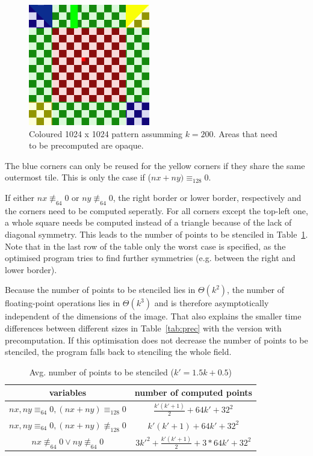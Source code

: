 \documentclass[letterpaper,twocolumn,10pt]{article}
\begin{document}
\begin{figure}[t]
	\begin{center}
	\includegraphics[width=150pt]{res/stencil_colored_with_prec}
	\caption{Coloured 1024 x 1024 pattern assumming $k = 200$. Areas that need to be precomputed are opaque.}
	\label{fig:board}
	\end{center}
	\vspace{-0.3in}
\end{figure}

The blue corners can only be reused for the yellow corners
if they share the same outermost tile. This is only the
case if ($nx + ny) \equiv_{128} 0$.

If either $nx \not\equiv_{64} 0$ or $ny \not\equiv_{64}0$, the right border or lower border,
respectively and the corners need to be computed seperatly.
For all corners except the top-left one,
a whole square needs be computed instead of a triangle because of the lack of diagonal symmetry.  
This leads to the number of points to be stenciled in Table~\ref{tab:numstencil}. Note that
in the last row of the table only the worst case is specified, as the optimised program
tries to find further symmetries (e.g. between the right and lower border).

Because the number of points to be stenciled lies in $\Theta(k^2)$, the number of floating-point
operations lies in $\Theta(k^3)$ and is therefore asymptotically independent of the dimensions of the image. That also explains the smaller time differences between different sizes in Table~\ref{tab:prec} with the version with precomputation.
If this optimisation does not decrease the number of points to be stenciled, the program falls back to stenciling the whole field.

\begin{table}[ht]
	\caption{Avg. number of points to be stenciled ($k' = 1.5k+0.5$)}
	\begin{tabular}{c c}
		variables & number of computed points\\
		\hline
		$\scriptstyle nx,ny \equiv_{64}0,(nx+ny) \equiv_{128}0$ & $ \frac{k'(k'+ 1)}{2} + 64k' + 32^{2}$\\
		$\scriptstyle nx,ny \equiv_{64}0,(nx+ny) \not\equiv_{128}0$ & $ k'(k'+1) + 64k' + 32^{2}$\\
		$\scriptstyle nx \not\equiv_{64}0 \lor \scriptstyle ny \not\equiv_{64}0$ & $ 3k'^{2} + \frac{k'(k'+1)}{2} + 3 * 64k' + 32^{2}$\\
	\end{tabular}
	\label{tab:numstencil}
\end{table}
\end{document}
